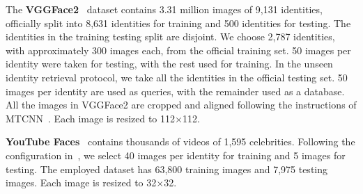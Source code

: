 \documentclass{elsarticle}
\begin{document}
The \textbf{VGGFace2}~\cite{cao2018vggface2} dataset contains 3.31 million images of 9,131 identities, officially split into 8,631 identities for training and 500 identities for testing. The identities in the training testing split are disjoint. We choose 2,787 identities, with approximately 300 images each, from the official training set. 50 images per identity were taken for testing, with the rest used for training. %
In the unseen identity retrieval protocol, we take all the identities in the official testing set. 50 images per identity are used as queries, with the remainder used as a database. All the images in VGGFace2 are cropped and aligned following the instructions of MTCNN~\cite{zhang2016joint}. Each image is resized to 112$\times$112.

\textbf{YouTube Faces}~\cite{wolf2011face} contains thousands of videos of 1,595 celebrities. %
Following the configuration in~\cite{lin2017discriminative}, we select 40 images per identity for training and 5 images for testing. The employed dataset has 63,800 training images and 7,975 testing images. Each image is resized to 32$\times$32. %
\end{document}
